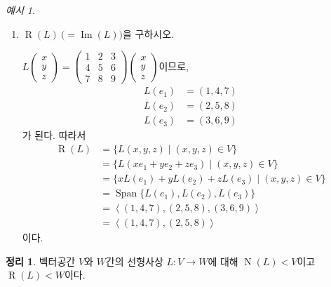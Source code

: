 \documentclass[unfonts,oneside,a4paper]{oblivoir}
\theoremstyle{definition}
\theoremstyle{theorem}
\newtheorem{theorem}{정리}[section]
\theoremstyle{theorem}
\theoremstyle{remark}
\theoremstyle{remark}
\theoremstyle{remark}
\newtheorem*{example}{예시}
\theoremstyle{remark}
\renewcommand{\vec}[1]{\bm{\mathit{#1}}}
\DeclareMathOperator{\Span}{Span}
\DeclareMathOperator{\Null}{N}
\DeclareMathOperator{\Image}{Im}
\DeclareMathOperator{\Range}{R}
\begin{document}
\begin{example}
\begin{enumerate}
    \item $\Range (L)\ \bigl(= \Image(L)\bigr)$을 구하시오.
        \begin{solution}
            $L \begin{pmatrix}
                x \\ y \\ z
                \end{pmatrix} = \begin{pmatrix}
                1 & 2 & 3 \\ 4 & 5 & 6 \\ 7 & 8 & 9
                \end{pmatrix} \begin{pmatrix}
                x \\ y \\ z
            \end{pmatrix}$이므로,
            \begin{align*}
                L(\vec e_1) &= (1, 4, 7)\\
                L(\vec e_2) &= (2, 5, 8)\\
                L(\vec e_3) &= (3, 6, 9)
            \end{align*}
            가 된다.
            따라서
            \begin{align*}
                \Range (L) &= \{L(x, y, z) \mid (x, y, z) \in V\}\\
                           &= \{L(x \vec e_1 + y \vec e_2 + z \vec e_3) \mid (x, y, z) \in V\}\\
                           &= \{x L(\vec e_1) + y L(\vec e_2) + z L(\vec e_3) \mid (x, y, z) \in V\}\\
                           &= \Span \{L(\vec e_1), L(\vec e_2), L(\vec e_3)\}\\
                           &= \left<(1, 4, 7), (2, 5, 8), (3, 6, 9)\right>\\
                           &= \left<(1, 4, 7), (2, 5, 8)\right>
            \end{align*}
            이다.
        \end{solution}
\end{enumerate}
\end{example}

\begin{theorem} \label{thm:nullspace_range}
    벡터공간 $V$와 $W$간의 선형사상 $L: V \rightarrow W$에 대해 $\Null (L) < V$이고 $\Range (L) < W$이다.
\end{theorem}
\end{document}
